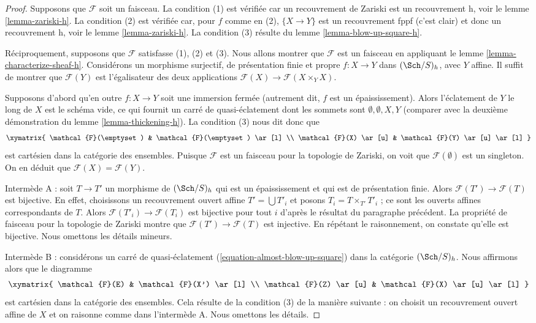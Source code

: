 \begin{proof}
Supposons que $\mathcal{F}$ soit un faisceau. La condition (1) est vérifiée car
un recouvrement de Zariski est un recouvrement h, voir
le lemme \ref{lemma-zariski-h}.
La condition (2) est vérifiée car, pour $f$ comme en (2),
$\{X \to Y\}$ est un recouvrement fppf (c'est clair)
et donc un recouvrement h, voir le lemme \ref{lemma-zariski-h}.
La condition (3) résulte du lemme \ref{lemma-blow-up-square-h}.

\medskip\noindent
Réciproquement, supposons que $\mathcal{F}$ satisfasse (1), (2) et (3).
Nous allons montrer que $\mathcal{F}$ est un faisceau en appliquant
le lemme \ref{lemma-characterize-sheaf-h}. Considérons
un morphisme surjectif, de présentation finie et propre
$f : X \to Y$ dans $(\Sch/S)_h$, avec $Y$ affine. Il suffit de montrer
que $\mathcal{F}(Y)$ est l'égalisateur des deux applications
$\mathcal{F}(X) \to \mathcal{F}(X \times_Y X)$.

\medskip\noindent
Supposons d'abord qu'en outre $f : X \to Y$ soit une immersion fermée
(autrement dit, $f$ est un épaississement). Alors l'éclatement de $Y$ le long de $X$
est le schéma vide, ce qui fournit un carré de quasi-éclatement
dont les sommets sont $\emptyset, \emptyset, X, Y$
(comparer avec la deuxième démonstration du lemme \ref{lemma-thickening-h}).
La condition (3) nous dit donc que
$$
\xymatrix{
\mathcal{F}(\emptyset) & \mathcal{F}(\emptyset) \ar[l] \\
\mathcal{F}(X) \ar[u] & \mathcal{F}(Y) \ar[u] \ar[l]
}
$$
est cartésien dans la catégorie des ensembles. Puisque $\mathcal{F}$ est un faisceau
pour la topologie de Zariski, on voit que $\mathcal{F}(\emptyset)$
est un singleton. On en déduit que $\mathcal{F}(X) = \mathcal{F}(Y)$.

\medskip\noindent
Intermède A : soit $T \to T'$ un morphisme de $(\Sch/S)_h$ qui est
un épaississement et qui est de présentation finie. Alors
$\mathcal{F}(T') \to \mathcal{F}(T)$ est bijective.
En effet, choisissons un recouvrement ouvert affine $T' = \bigcup T'_i$
et posons $T_i = T \times_{T'} T'_i$ ; ce sont les ouverts affines correspondants
de $T$. Alors $\mathcal{F}(T'_i) \to \mathcal{F}(T_i)$
est bijective pour tout $i$ d'après le résultat du paragraphe précédent.
La propriété de faisceau pour la topologie de Zariski montre que
$\mathcal{F}(T') \to \mathcal{F}(T)$ est injective. En répétant le
raisonnement, on constate qu'elle est bijective. Nous omettons les détails mineurs.

\medskip\noindent
Intermède B : considérons un carré de quasi-éclatement
(\ref{equation-almost-blow-up-square}) dans la catégorie $(\Sch/S)_h$.
Nous affirmons alors que le diagramme
$$
\xymatrix{
\mathcal{F}(E) & \mathcal{F}(X') \ar[l] \\
\mathcal{F}(Z) \ar[u] & \mathcal{F}(X) \ar[u] \ar[l]
}
$$
est cartésien dans la catégorie des ensembles. Cela résulte de la condition
(3) de la manière suivante : on choisit un recouvrement ouvert affine de $X$ et on raisonne
comme dans l'intermède A. Nous omettons les détails.


\end{proof}
